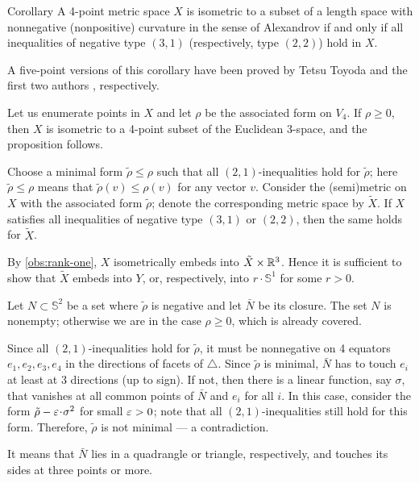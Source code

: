 \documentclass[a4paper,10pt]{article}
\begin{document}
\begin{thm}{Corollary}\label{cor:Four-point arrays}
A 4-point metric space $X$ is isometric to a subset of a length space with nonnegative (nonpositive) curvature in the sense of Alexandrov if and only if all inequalities of negative type $(3, 1)$ (respectively, type $(2, 2)$) hold in $X$.
\end{thm}

A five-point versions of this corollary have been proved by Tetsu Toyoda \cite{toyoda,lebedeva-petrunin2021} and the first two authors \cite{lebedeva-petrunin-2024}, respectively.

Let us enumerate points in $X$ and let $\rho$ be the associated form on $V_4$.
If $\rho\ge 0$, then $X$ is isometric to a 4-point subset of the Euclidean 3-space,
and the proposition follows.

Choose a minimal form $\tilde\rho\le \rho$ such that all $(2,1)$-inequalities hold for $\tilde\rho$;
here $\tilde\rho\le \rho$ means that $\tilde\rho(v)\le \rho(v)$ for any vector $v$.
Consider the (semi)metric on $X$ with the associated form $\tilde\rho$;
denote the corresponding metric space by $\tilde X$.
If $X$ satisfies all inequalities of negative type $(3, 1)$ or $(2,2)$, then the same holds for $\tilde X$.

By \ref{obs:rank-one}, $X$ isometrically embeds into $\tilde X\times \mathbb{R}^3$.
Hence it is sufficient to show that $\tilde X$ embeds into $Y$, or, respectively, into $r\cdot \mathbb{S}^1$ for some $r>0$.

Let $N\subset \mathbb{S}^2$ be a set where $\tilde\rho$ is negative and let $\bar N$ be its closure.
The set $N$ is nonempty; otherwise we are in the case $\rho\ge 0$, which is already covered.

Since all $(2,1)$-inequalities hold for $\tilde\rho$,
it must be nonnegative on 4 equators $e_1,e_2,e_3,e_4$ in the directions of facets of $\triangle$.
Since $\tilde\rho$ is minimal, $\bar N$ has to touch $e_i$ at least at 3 directions (up to sign). 
If not, then there is a linear function, say $\sigma$, that vanishes at all common points of $\bar N$ and $e_i$ for all $i$.
In this case, consider the form $\tilde\rho-\eps\cdot \sigma^2$ for small $\varepsilon>0$;
note that all $(2,1)$-inequalities still hold for this form.
Therefore, $\tilde\rho$ is not minimal --- a contradiction.

It means that $\bar N$ lies in a quadrangle or triangle, respectively, and touches its sides at three points or more.
\end{document}
